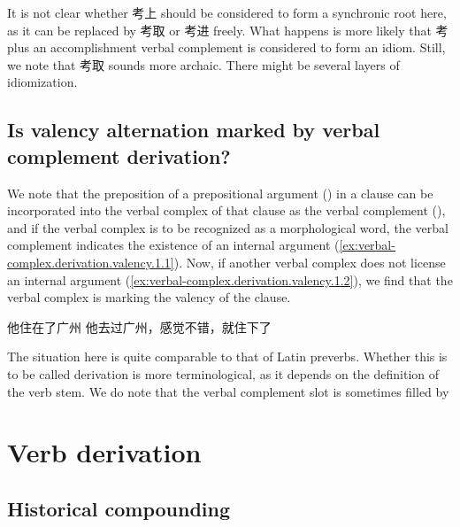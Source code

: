 \documentclass[UTF8, a4paper, oneside, scheme=plain, 12pt]{ctexrep}
\begin{document}
It is not clear whether 考上 should be considered to form a synchronic root here,
as it can be replaced by 考取 or 考进 freely.
What happens is more likely that 考 plus an accomplishment verbal complement is considered to form an idiom.
Still, we note that 考取 sounds more archaic.
There might be several layers of idiomization.

\subsection{Is valency alternation marked by verbal complement derivation?}\label{sec:verbal-complex.derivation.valency}

We note that the preposition of a prepositional argument  
() in a clause
can be incorporated into the verbal complex of that clause
as the verbal complement (),
and if the verbal complex is to be recognized as a morphological word,
the verbal complement indicates the existence of an internal argument
(\ref{ex:verbal-complex.derivation.valency.1.1}).
Now, if another verbal complex does not license an internal argument 
(\ref{ex:verbal-complex.derivation.valency.1.2}),
we find that the verbal complex is marking the valency of the clause.

\begin{exe}
    \ex\label{ex:verbal-complex.derivation.valency.1} \begin{xlist}
        \ex\label{ex:verbal-complex.derivation.valency.1.1} 他住在了广州
        \ex\label{ex:verbal-complex.derivation.valency.1.2} 他去过广州，感觉不错，就住下了
    \end{xlist}
\end{exe}

The situation here is quite comparable to that of Latin preverbs.
Whether this is to be called derivation is more terminological,
as it depends on the definition of the verb stem.
We do note that the verbal complement slot is sometimes filled by 


\section{Verb derivation}

\subsection{Historical compounding}\label{sec:verbal-complex.derivation.compound}
\end{document}
